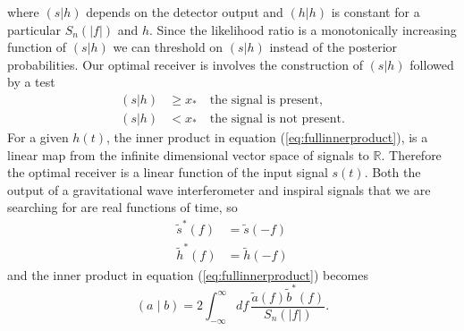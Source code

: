 where $(s|h)$ depends on the detector output and $(h|h)$ is constant for a
particular $S_n(|f|)$ and $h$. Since the likelihood ratio is a monotonically
increasing function of $(s|h)$ we can threshold on $(s|h)$ instead of the
posterior probabilities. Our optimal receiver is involves the construction of
$(s|h)$ followed by a test
\begin{equation}
\begin{split}
(s|h) &\ge x_\ast \quad \text{the signal is present}, \\
(s|h) &< x_\ast \quad \text{the signal is not present}.
\end{split}
\end{equation}
For a given $h(t)$, the inner
product in equation (\ref{eq:fullinnerproduct}), is a linear map from the
infinite dimensional vector space of signals to $\mathbb{R}$. Therefore the
optimal receiver is a linear function of the input signal $s(t)$. Both the
output of a gravitational wave interferometer and inspiral signals that we are
searching for are real functions of time, so 
\begin{align}
\tilde{s}^\ast(f) &= \tilde{s}(-f) \\
\tilde{h}^\ast(f) &= \tilde{h}(-f)
\end{align}
and the inner product in equation (\ref{eq:fullinnerproduct}) becomes
\begin{equation}
\left(a\mid b\right) = 2 \int_{-\infty}^{\infty}df\,
\frac{\tilde{a}(f)\tilde{b}^\ast(f)}{S_n\left(\left|f\right|\right)}.
\label{eq:innerproduct}
\end{equation}

